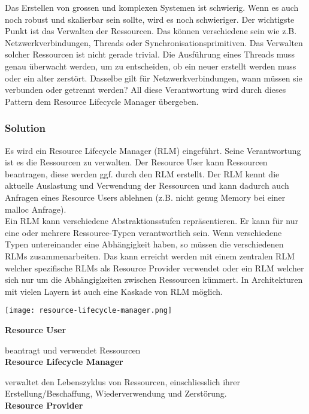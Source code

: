 Das Erstellen von grossen und komplexen Systemen ist schwierig. Wenn es auch noch robust und skalierbar sein sollte, wird es noch schwieriger. Der wichtigste Punkt ist das Verwalten der Ressourcen. Das können verschiedene sein wie z.B. Netzwerkverbindungen, Threads oder Synchronisationsprimitiven. Das Verwalten solcher Ressourcen ist nicht gerade trivial. Die Ausführung eines Threads muss genau überwacht werden, um zu entscheiden, ob ein neuer erstellt werden muss oder ein alter zerstört. Dasselbe gilt für Netzwerkverbindungen, wann müssen sie verbunden oder getrennt werden? All diese Verantwortung wird durch dieses Pattern dem Resource Lifecycle Manager übergeben.

\subsubsection{Solution}

Es wird ein Resource Lifecycle Manager (RLM) eingeführt. Seine Verantwortung ist es die Ressourcen zu verwalten. Der Resource User kann Ressourcen beantragen, diese werden ggf. durch den RLM erstellt. Der RLM kennt die aktuelle Auslastung und Verwendung der Ressourcen und kann dadurch auch Anfragen eines Resource Users ablehnen (z.B. nicht genug Memory bei einer malloc Anfrage). \\

Ein RLM kann verschiedene Abstraktionsstufen repräsentieren. Er kann für nur eine oder mehrere Ressource-Typen verantwortlich sein. Wenn verschiedene Typen untereinander eine Abhängigkeit haben, so müssen die verschiedenen RLMs zusammenarbeiten. Das kann erreicht werden mit einem zentralen RLM welcher spezifische RLMs als Resource Provider verwendet oder ein RLM welcher sich nur um die Abhängigkeiten zwischen Ressourcen kümmert. In Architekturen mit vielen Layern ist auch eine Kaskade von RLM möglich.

\texttt{[image: resource-lifecycle-manager.png]}

\textbf{Resource User}

beantragt und verwendet Ressourcen \\

\textbf{Resource Lifecycle Manager}

verwaltet den Lebenszyklus von Ressourcen, einschliesslich ihrer Erstellung/Beschaffung, Wiederverwendung und Zerstörung. \\

\textbf{Resource Provider}

